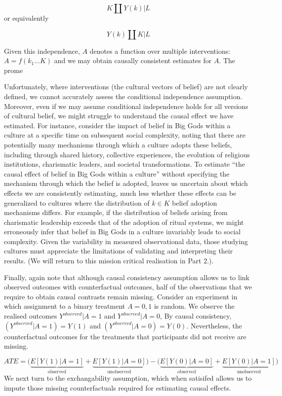 \documentclass[
  singlecolumn]{report}
\begin{document}
\[K \coprod Y(k) | L\] or equivalently

\[Y(k) \coprod K | L\]

Given this independence, \(A\) denotes a function over multiple
interventions: \(A = f(k_1\dots K)\) and we may obtain causally
consistent estimates for \(A\). The prome

Unfortunately, where interventions (the cultural vectors of belief) are
not clearly defined, we cannot accurately assess the conditional
independence assumption. Moreover, even if we may assume conditional
independence holds for all versions of cultural belief, we might
struggle to understand the causal effect we have estimated. For
instance, consider the impact of belief in Big Gods within a culture at
a specific time on subsequent social complexity, noting that there are
potentially many mechanisms through which a culture adopts these
beliefs, including through shared history, collective experiences, the
evolution of religious institutions, charismatic leaders, and societal
transformations. To estimate ``the causal effect of belief in Big Gods
within a culture'' without specifying the mechanism through which the
belief is adopted, leaves us uncertain about which effects we are
consistently estimating, much less whether these effects can be
generalized to cultures where the distribution of \(k \in K\) belief
adoption mechanisms differs. For example, if the distribution of beliefs
arising from charismatic leadership exceeds that of the adoption of
ritual systems, we might erroneously infer that belief in Big Gods in a
culture invariably leads to social complexity. Given the variability in
measured observational data, those studying cultures must appreciate the
limitations of validating and interpreting their results. (We will
return to this mission critical realisation in Part 2.).

Finally, again note that although causal consistency assumption allows
us to link observed outcomes with counterfactual outcomes, half of the
observations that we require to obtain causal contrasts remain missing.
Consider an experiment in which assignment to a binary treatment
\(A = {0,1}\) is random. We observe the realised outcomes
\(Y^{observed}|A = 1\) and \(Y^{observed}|A = 0\), By causal
consistency, \((Y^{observed}|A = 1) = Y(1)\) and
\((Y^{observed}|A = 0) = Y(0)\). Nevertheless, the counterfactual
outcomes for the treatments that participants did not receive are
missing.

\[
ATE = \bigg(\underbrace{E[Y(1)|A = 1]}_\text{observed} + \underbrace{E[Y(1)|A = 0]}_\text{unobserved}\bigg) - \bigg(\underbrace{E[Y(0)|A = 0]}_\text{observed}  + \underbrace{E[Y(0)|A = 1]}_\text{unobserved}\bigg)
\] We next turn to the exchangability assumption, which when satisifed
allows us to impute those missing counterfactuals required for
estimating causal effects.
\end{document}
